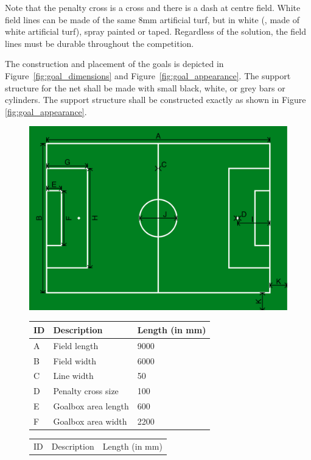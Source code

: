 Note that the penalty cross is a cross and there is a dash at centre field. White field lines can be made of the same 8mm artificial turf, but in white (\ie, made of white artificial turf), spray painted or taped. Regardless of the solution, the field lines must be durable throughout the competition.

The construction and placement of the goals is depicted in Figure~\ref{fig:goal_dimensions} and Figure~\ref{fig:goal_appearance}. The support structure for the net shall be made with small black, white, or grey bars or cylinders. The support structure shall be constructed exactly as shown in Figure \ref{fig:goal_appearance}.


\begin{figure}[b!]
	\centering
	\centerline{\includegraphics[width=\columnwidth]{figs/fieldDimensions2020.pdf}}
	\vspace{1ex}
	\begin{tabular}{| l | l | l |}
		ID & Description & Length (in mm) \\
		\hline \hline
		A & Field length & 9000 \\
		\hline
		B & Field width & 6000 \\
		\hline
		C & Line width & 50 \\
		\hline
		D & Penalty cross size & 100 \\
		\hline
		E & Goalbox area length & 600 \\
		\hline
		F & Goalbox area width & 2200 \\
	\end{tabular}
	\begin{tabular}{|l|l|l|}
		ID & Description & Length (in mm) \\

\end{tabular}
\end{figure}
